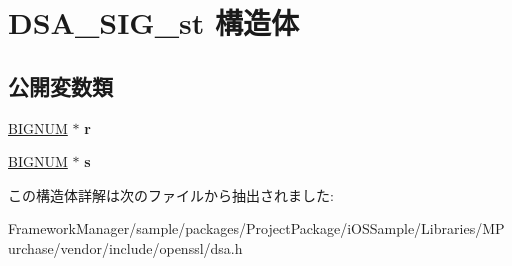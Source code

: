 \hypertarget{struct_d_s_a___s_i_g__st}{}\section{D\+S\+A\+\_\+\+S\+I\+G\+\_\+st 構造体}
\label{struct_d_s_a___s_i_g__st}
\subsection*{公開変数類}
\begin{DoxyCompactItemize}
\item 
\hypertarget{struct_d_s_a___s_i_g__st_a745899b460d408e175d9adee66ef046e}{}\hyperlink{structbignum__st}{B\+I\+G\+N\+U\+M} $\ast$ {\bfseries r}\label{struct_d_s_a___s_i_g__st_a745899b460d408e175d9adee66ef046e}

\item 
\hypertarget{struct_d_s_a___s_i_g__st_ae7c55f852d6ca0b46b5d5c99dcfb8c2d}{}\hyperlink{structbignum__st}{B\+I\+G\+N\+U\+M} $\ast$ {\bfseries s}\label{struct_d_s_a___s_i_g__st_ae7c55f852d6ca0b46b5d5c99dcfb8c2d}

\end{DoxyCompactItemize}


この構造体詳解は次のファイルから抽出されました\+:\begin{DoxyCompactItemize}
\item 
Framework\+Manager/sample/packages/\+Project\+Package/i\+O\+S\+Sample/\+Libraries/\+M\+Purchase/vendor/include/openssl/dsa.\+h\end{DoxyCompactItemize}
